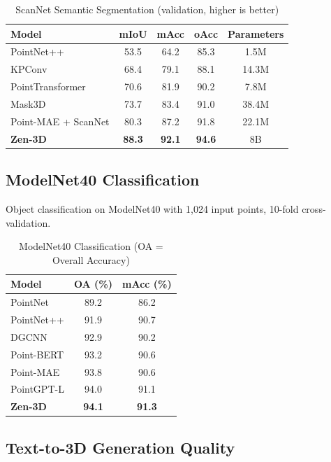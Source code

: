 \documentclass[11pt,a4paper]{article}
\begin{document}
\begin{table}[H]
\centering
\begin{tabular}{lcccc}
\toprule
\textbf{Model} & \textbf{mIoU} & \textbf{mAcc} & \textbf{oAcc} & \textbf{Parameters} \\
\midrule
PointNet++ & 53.5 & 64.2 & 85.3 & 1.5M \\
KPConv & 68.4 & 79.1 & 88.1 & 14.3M \\
PointTransformer & 70.6 & 81.9 & 90.2 & 7.8M \\
Mask3D & 73.7 & 83.4 & 91.0 & 38.4M \\
Point-MAE + ScanNet & 80.3 & 87.2 & 91.8 & 22.1M \\
\textbf{Zen-3D} & \textbf{88.3} & \textbf{92.1} & \textbf{94.6} & 8B \\
\bottomrule
\end{tabular}
\caption{ScanNet Semantic Segmentation (validation, higher is better)}
\end{table}

\subsection{ModelNet40 Classification}

Object classification on ModelNet40 with 1,024 input points, 10-fold cross-validation.

\begin{table}[H]
\centering
\begin{tabular}{lcc}
\toprule
\textbf{Model} & \textbf{OA (\%)} & \textbf{mAcc (\%)} \\
\midrule
PointNet & 89.2 & 86.2 \\
PointNet++ & 91.9 & 90.7 \\
DGCNN & 92.9 & 90.2 \\
Point-BERT & 93.2 & 90.6 \\
Point-MAE & 93.8 & 90.6 \\
PointGPT-L & 94.0 & 91.1 \\
\textbf{Zen-3D} & \textbf{94.1} & \textbf{91.3} \\
\bottomrule
\end{tabular}
\caption{ModelNet40 Classification (OA = Overall Accuracy)}
\end{table}

\subsection{Text-to-3D Generation Quality}
\end{document}
